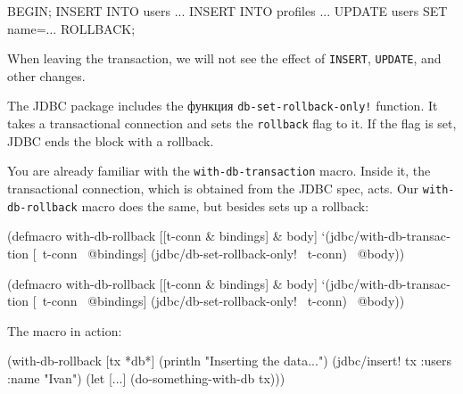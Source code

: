 \begin{english}
  \begin{sql}
BEGIN;
INSERT INTO users ...
INSERT INTO profiles ...
UPDATE users SET name=...
ROLLBACK;
  \end{sql}
\end{english}

When leaving the transaction, we will not see the effect of \verb|INSERT|, \verb|UPDATE|, and other changes.

The JDBC package includes the функция \texttt{db-set-roll\-back-only!} function. It takes a transactional connection and sets the \verb|rollback| flag to it. If the flag is set, JDBC ends the block with a rollback.


You are already familiar with the \texttt{with-db-tran\-saction} macro. Inside it, the transactional connection, which is obtained from the JDBC spec, acts. Our \verb|with-db-rollback| macro does the same, but besides sets up a rollback:

\ifx\DEVICETYPE\MOBILE

\begin{english}
  \begin{clojure}
(defmacro with-db-rollback
  [[t-conn & bindings] & body]
  `(jdbc/with-db-transaction
     [~t-conn ~@bindings]
     (jdbc/db-set-rollback-only!
       ~t-conn)
     ~@body))
  \end{clojure}
\end{english}

\else

\begin{english}
  \begin{clojure}
(defmacro with-db-rollback
  [[t-conn & bindings] & body]
  `(jdbc/with-db-transaction [~t-conn ~@bindings]
     (jdbc/db-set-rollback-only! ~t-conn)
     ~@body))
  \end{clojure}
\end{english}

\fi

\noindent
The macro in action:

\ifx\DEVICETYPE\MOBILE

\begin{english}
  \begin{clojure}
(with-db-rollback [tx *db*]
  (println "Inserting the data...")
  (jdbc/insert! tx
    :users {:name "Ivan"})
  (let [...]
    (do-something-with-db tx)))
  \end{clojure}
\end{english}

